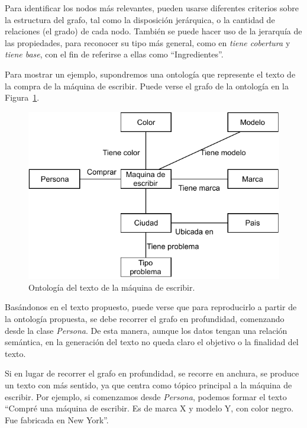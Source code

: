 Para identificar los nodos más relevantes, pueden usarse diferentes criterios sobre la estructura del grafo, tal como la disposición jerárquica, o la cantidad de relaciones (el grado) de cada nodo. También se puede hacer uso de la jerarquía de las propiedades, para reconocer su tipo más general, como en \emph{tiene cobertura} y \emph{tiene base}, con el fin de referirse a ellas como ``Ingredientes''.

Para mostrar un ejemplo, supondremos una ontología que represente el texto de la compra de la máquina de escribir. Puede verse el grafo de la ontología en la Figura~\ref{fig:maquina_escr}.

\begin{figure}
    \centering
    \includegraphics[scale=0.65]{img/presentacion_problema/onto_maq_escr.pdf}
    \caption{Ontología del texto de la máquina de escribir.}
    \label{fig:maquina_escr}
\end{figure}

Basándonos en el texto propuesto, puede verse que para reproducirlo a partir de la ontología propuesta, se debe recorrer el grafo en profundidad, comenzando desde la clase \emph{Persona}. De esta manera, aunque los datos tengan una relación semántica, en la generación del texto no queda claro el objetivo o la finalidad del texto. 

Si en lugar de recorrer el grafo en profundidad, se recorre en anchura, se produce un texto con más sentido, ya que centra como tópico principal a la máquina de escribir. Por ejemplo, si comenzamos desde \emph{Persona}, podemos formar el texto ``Compré una máquina de escribir. Es de marca X y modelo Y, con color negro. Fue fabricada en New York''.


